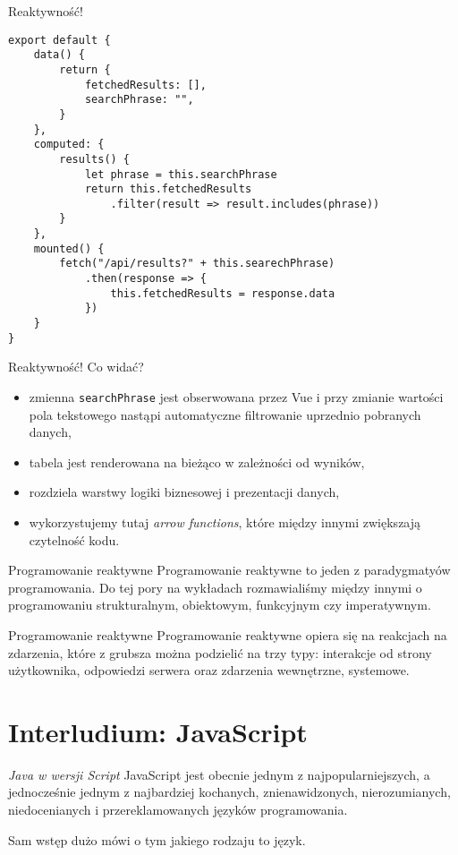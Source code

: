 \begin{frame}[fragile]{Reaktywność!}
	\begin{lstlisting}
export default {
    data() {
        return {
            fetchedResults: [],
            searchPhrase: "",
        }
    },
    computed: {
        results() {
            let phrase = this.searchPhrase
            return this.fetchedResults
                .filter(result => result.includes(phrase))
        }
    },
    mounted() {
        fetch("/api/results?" + this.searechPhrase)
            .then(response => {
                this.fetchedResults = response.data
            })
    }
}
	\end{lstlisting}
\end{frame}

\begin{frame}{Reaktywność!}
	Co widać?
	\begin{itemize}
	\item zmienna \texttt{searchPhrase} jest obserwowana przez Vue i przy zmianie wartości pola tekstowego nastąpi automatyczne filtrowanie uprzednio pobranych danych,
	\item tabela jest renderowana na bieżąco w zależności od wyników,
	\item rozdziela warstwy logiki biznesowej i prezentacji danych,
	\item wykorzystujemy tutaj \emph{arrow functions}, które między innymi zwiększają czytelność kodu.
	\end{itemize}
\end{frame}

\begin{frame}{Programowanie reaktywne}
	Programowanie reaktywne to jeden z paradygmatyów programowania. Do tej pory na wykładach rozmawialiśmy między innymi o programowaniu strukturalnym, obiektowym, funkcyjnym czy imperatywnym.
\end{frame}

\begin{frame}{Programowanie reaktywne}
	Programowanie reaktywne opiera się na reakcjach na zdarzenia, które z grubsza można podzielić na trzy typy: interakcje od strony użytkownika, odpowiedzi serwera oraz zdarzenia wewnętrzne, systemowe.
\end{frame}

\section{Interludium: JavaScript}

\begin{frame}{\emph{Java w wersji Script}}
	JavaScript jest obecnie jednym z najpopularniejszych, a jednocześnie jednym z najbardziej kochanych, znienawidzonych, nierozumianych, niedocenianych i przereklamowanych języków programowania.
	
	Sam wstęp dużo mówi o tym jakiego rodzaju to język.
\end{frame}

